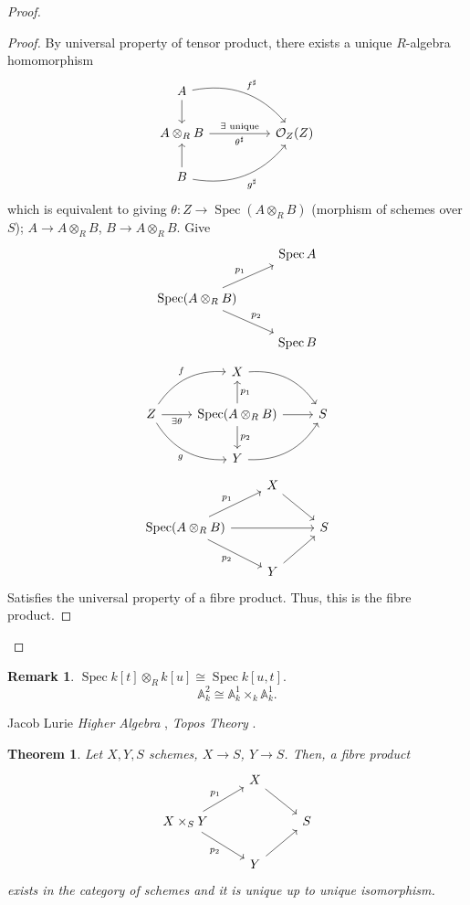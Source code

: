 \documentclass[12pt]{article}
\DeclareMathOperator{\Spec}{Spec}
\newtheorem*{theorem}{Theorem}
\theoremstyle{definition}
\newtheorem*{remark}{Remark}
\begin{document}
\begin{proof}
\begin{itemize}[label=$-$]
\begin{proof}
By universal property of tensor product, there exists a unique $R$-algebra homomorphism
\[\begin{tikzcd}A\arrow[rrd,"f^\sharp",bend left]\arrow[d]\\A\otimes_RB\arrow[rr,"\exists\text{ unique}","\theta^\sharp"']&&\mathcal O_Z(Z)\\B\arrow[u]\arrow[rru,"g^\sharp",swap,bend right]\end{tikzcd}\]
which is equivalent to giving $\theta:Z\rightarrow\Spec(A\otimes_RB)$ (morphism of schemes over $S$); $A\rightarrow A\otimes_RB$, $B\rightarrow A\otimes_RB$. Give
\[\begin{tikzcd}&\Spec A\\\Spec(A\otimes_RB)\arrow[ru,"p_1"]\arrow[rd,"p_2"]\\&\Spec B\end{tikzcd}\]
\[\begin{tikzcd}&X\arrow[rd,bend left]\\Z\arrow[ru,"f",bend left]\arrow[r,"\exists\theta",swap]\arrow[rd,"g",bend right,swap]&\Spec(A\otimes_RB)\arrow[u,"p_1",swap]\arrow[r]\arrow[d,"p_2"]&S\\&Y\arrow[ru,bend right]\end{tikzcd}\]
\[\begin{tikzcd}&X\arrow[rd]\\\Spec(A\otimes_RB)\arrow[ru,"p_1"]\arrow[rd,"p_2",swap]\arrow[rr]&&S\\&Y\arrow[ru]\end{tikzcd}\]
Satisfies the universal property of a fibre product. Thus, this is the fibre product.
\end{proof}
\end{itemize}
\end{proof}

\begin{remark}
$\Spec k[t]\otimes_Rk[u]\cong\Spec k[u,t]$.
\[\mathbb A_k^2\cong\mathbb A_k^1\times_k\mathbb A_k^1.\]
\end{remark}

Jacob Lurie \emph{Higher Algebra} \cite{lurie2017higher}, \emph{Topos Theory} \cite{lurie2009higher}.

\begin{theorem}
Let $X,Y,S$ schemes, $X\rightarrow S$, $Y\rightarrow S$. Then, a fibre product
\[\begin{tikzcd}&X\arrow[rd]\\X\times_SY\arrow[ru,"p_1"]\arrow[rd,"p_2",swap]&&S\\&Y\arrow[ru]\end{tikzcd}\]
exists in the category of schemes and it is unique up to unique isomorphism.
\end{theorem}
\end{document}
